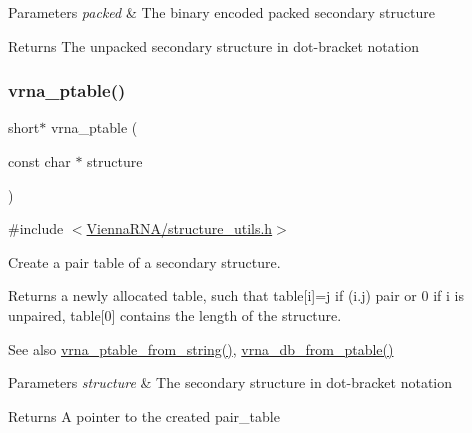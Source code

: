 \begin{DoxyParams}{Parameters}
{\em packed} & The binary encoded packed secondary structure \\
\hline
\end{DoxyParams}
\begin{DoxyReturn}{Returns}
The unpacked secondary structure in dot-\/bracket notation 
\end{DoxyReturn}
\mbox{\label{group__struct__utils_gae829fb8bb7f694c12a9c0bbc34c77c60}} 
\subsubsection{\texorpdfstring{vrna\+\_\+ptable()}{vrna\_ptable()}}
{\footnotesize\ttfamily short$\ast$ vrna\+\_\+ptable (\begin{DoxyParamCaption}\item[{const char $\ast$}]{structure }\end{DoxyParamCaption})}



{\ttfamily \#include $<$\hyperlink{structure__utils_8h}{Vienna\+R\+N\+A/structure\+\_\+utils.\+h}$>$}



Create a pair table of a secondary structure. 

Returns a newly allocated table, such that table\mbox{[}i\mbox{]}=j if (i.\+j) pair or 0 if i is unpaired, table\mbox{[}0\mbox{]} contains the length of the structure.

\begin{DoxySeeAlso}{See also}
\hyperlink{group__struct__utils_gac76c9ef3de507748fb0416a59323362b}{vrna\+\_\+ptable\+\_\+from\+\_\+string()}, \hyperlink{group__struct__utils_gaf9ecd0d7877fecdbb0292e24f40283d5}{vrna\+\_\+db\+\_\+from\+\_\+ptable()}
\end{DoxySeeAlso}

\begin{DoxyParams}{Parameters}
{\em structure} & The secondary structure in dot-\/bracket notation \\
\hline
\end{DoxyParams}
\begin{DoxyReturn}{Returns}
A pointer to the created pair\+\_\+table 
\end{DoxyReturn}
\mbox{\label{group__struct__utils_gac76c9ef3de507748fb0416a59323362b}} 
